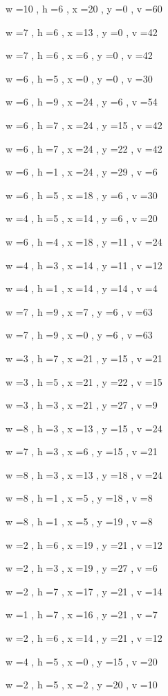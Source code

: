 \documentclass[11pt]{article}
\begin{document}
w =10 , h =6 , x =20 , y =0 , v =60
\par
w =7 , h =6 , x =13 , y =0 , v =42
\par
w =7 , h =6 , x =6 , y =0 , v =42
\par
w =6 , h =5 , x =0 , y =0 , v =30
\par
w =6 , h =9 , x =24 , y =6 , v =54
\par
w =6 , h =7 , x =24 , y =15 , v =42
\par
w =6 , h =7 , x =24 , y =22 , v =42
\par
w =6 , h =1 , x =24 , y =29 , v =6
\par
w =6 , h =5 , x =18 , y =6 , v =30
\par
w =4 , h =5 , x =14 , y =6 , v =20
\par
w =6 , h =4 , x =18 , y =11 , v =24
\par
w =4 , h =3 , x =14 , y =11 , v =12
\par
w =4 , h =1 , x =14 , y =14 , v =4
\par
w =7 , h =9 , x =7 , y =6 , v =63
\par
w =7 , h =9 , x =0 , y =6 , v =63
\par
w =3 , h =7 , x =21 , y =15 , v =21
\par
w =3 , h =5 , x =21 , y =22 , v =15
\par
w =3 , h =3 , x =21 , y =27 , v =9
\par
w =8 , h =3 , x =13 , y =15 , v =24
\par
w =7 , h =3 , x =6 , y =15 , v =21
\par
w =8 , h =3 , x =13 , y =18 , v =24
\par
w =8 , h =1 , x =5 , y =18 , v =8
\par
w =8 , h =1 , x =5 , y =19 , v =8
\par
w =2 , h =6 , x =19 , y =21 , v =12
\par
w =2 , h =3 , x =19 , y =27 , v =6
\par
w =2 , h =7 , x =17 , y =21 , v =14
\par
w =1 , h =7 , x =16 , y =21 , v =7
\par
w =2 , h =6 , x =14 , y =21 , v =12
\par
w =4 , h =5 , x =0 , y =15 , v =20
\par
w =2 , h =5 , x =2 , y =20 , v =10
\par
\newpage
\end{document}
